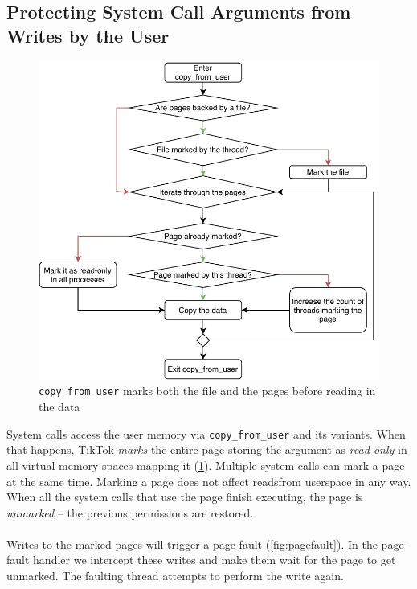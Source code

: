 \subsection{Protecting System Call Arguments from Writes by the User}
\label{subsec:userland}
\begin{figure}[]
  \centering
  \includegraphics[width = .45 \textwidth]{img/copy_from_user.pdf}
  \caption{\texttt{copy\_from\_user} marks both the file and the pages before
  reading in the data}
  \label{fig:copyfromuser}
\end{figure}

System calls access the user memory via \texttt{copy\_from\_user} and its 
variants. When that happens, TikTok \emph{marks} the entire page storing the 
argument as \emph{read-only} in all virtual memory spaces mapping it 
(\cref{fig:copyfromuser}). Multiple system calls can mark a page at the same 
time. Marking a page does not affect readsfrom userspace in any way. When all 
the system calls that use the page finish executing, the page is \emph{unmarked}
 -- the previous permissions are restored.
\\
\\
Writes to the marked pages will trigger a page-fault (\cref{fig:pagefault}). In 
the page-fault handler we intercept these writes and make them wait for the page
to get unmarked. The faulting thread attempts to perform the write again.

